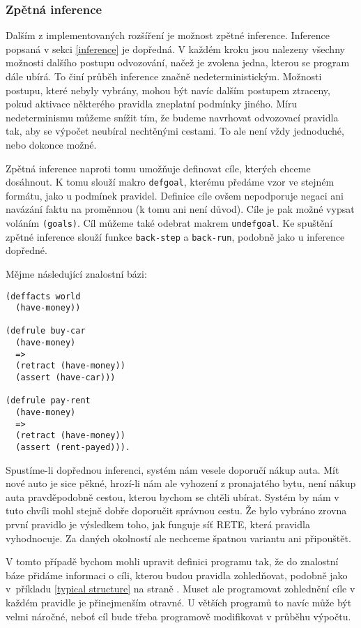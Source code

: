 \subsubsection{Zpětná inference}

Dalším z implementovaných rozšíření je možnost zpětné inference. Inference
popsaná v sekci \ref{inference} je dopředná. V každém kroku jsou nalezeny
všechny možnosti dalšího postupu odvozování, načež je zvolena jedna, kterou se
program dále ubírá. To činí průběh inference značně nedeterministickým. Možnosti
postupu, které nebyly vybrány, mohou být navíc dalším postupem ztraceny, pokud
aktivace některého pravidla zneplatní podmínky jiného.
Míru nedeterminismu můžeme snížit tím, že budeme navrhovat odvozovací pravidla
tak, aby se výpočet neubíral nechtěnými cestami. To ale není vždy jednoduché,
nebo dokonce možné.

Zpětná inference naproti tomu umožňuje definovat cíle, kterých chceme dosáhnout.
K tomu slouží makro \verb|defgoal|, kterému předáme vzor ve stejném formátu,
jako u podmínek pravidel. Definice cíle ovšem nepodporuje negaci ani navázání
faktu na proměnnou (k tomu ani není důvod). Cíle je pak možné vypsat voláním
\verb|(goals)|. Cíl můžeme také odebrat makrem \verb|undefgoal|.
Ke spuštění zpětné inference slouží funkce \verb|back-step| a
\verb|back-run|, podobně jako u inference dopředné.

Mějme následující znalostní bázi:
\begin{verbatim}
(deffacts world
  (have-money))

(defrule buy-car
  (have-money)
  =>
  (retract (have-money))
  (assert (have-car)))

(defrule pay-rent
  (have-money)
  =>
  (retract (have-money))
  (assert (rent-payed))).
\end{verbatim}
Spustíme-li dopřednou inferenci, systém nám vesele doporučí nákup auta.
Mít nové auto je sice pěkné, hrozí-li nám ale vyhození z pronajatého bytu,
není nákup auta pravděpodobně cestou, kterou bychom se chtěli ubírat.
Systém by nám v tuto chvíli mohl stejně dobře doporučit správnou cestu. Že bylo
vybráno zrovna první pravidlo je výsledkem toho, jak funguje síť RETE, která
pravidla vyhodnocuje. Za daných okolností ale nechceme špatnou variantu ani
připouštět.

V tomto případě bychom mohli upravit definici programu tak, že do znalostní báze
přidáme informaci o cíli, kterou budou pravidla zohledňovat, podobně jako
v~příkladu \ref{typical structure} na straně \pageref{typical structure}. Muset
ale programovat zohlednění cíle v každém pravidle je přinejmenším otravné. U
větších programů to navíc může být velmi náročné, neboť cíl bude třeba
programově modifikovat v průběhu výpočtu.

